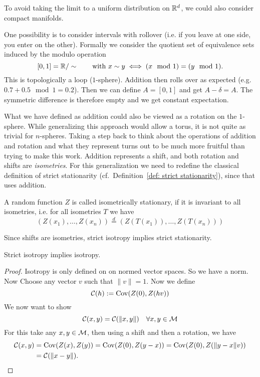 To avoid taking the limit to a uniform distribution on \(\mathbb{R}^d\), we could
also consider compact manifolds.

\begin{example}[1-sphere]
	One possibility is to consider intervals with
	rollover (i.e. if you leave at one side, you enter on the other). Formally
	we consider the quotient set of equivalence sets induced by the modulo operation
	\[
		[0,1] = \mathbb{R}/\sim \qquad \text{with } x\sim y \iff (x\mod 1) = (y\mod 1).
	\]
	This is topologically a loop (\(1\)-sphere). Addition then rolls over as expected (e.g. \(0.7
	+ 0.5 \mod 1 = 0.2\)).  Then we can define \(A=[0,1]\) and get \(A-\delta = A\).
	The symmetric difference is therefore empty and we get constant expectation.
\end{example}

What we have defined as addition could also be viewed as a rotation on the
\(1\)-sphere. While generalizing this approach would allow a torus, it is not quite
as trivial for \(n\)-spheres. Taking a step back to think about the operations
of addition and rotation and what they represent turns out to be much more
fruitful than trying to make this work. Addition represents a shift, and both
rotation and shifts are \emph{isometries}. For this generalization we need to
redefine the classical definition of strict stationarity
(cf.~Definition~\ref{def: strict stationarity}), since that uses addition.
\begin{definition}
	A random function \(Z\) is called isometrically stationary, if it is invariant to
	all isometries, i.e. for all isometries \(T\) we have
	\[
		(Z(x_1), \dots, Z(x_n))
		\overset{d}= (Z(T(x_1)), \dots, Z(T(x_n)))
	\]
\end{definition}
\begin{remark}
Since shifts are isometries, strict isotropy implies strict stationarity.
\end{remark}
\begin{lemma}
	Strict isotropy implies isotropy.
\end{lemma}
\begin{proof}
	Isotropy is only defined on on normed vector spaces. So we have a norm. Now
	Choose any vector \(v\) such that \(\|v\|=1\). Now we define
	\[
		\mathcal{C}(h):= \operatorname{Cov}(Z(0), Z(hv))
	\]
	We now want to show
	\[
		\mathcal{C}(x,y) = \mathcal{C}(\|x,y\|) \quad \forall x,y\in \mathcal{M}
	\]
	For this take any \(x,y\in \mathcal{M}\), then using
	a shift and then a rotation, we have
	\begin{align*}
		\mathcal{C}(x,y)
		&= \operatorname{Cov}(Z(x), Z(y))
		= \operatorname{Cov}(Z(0), Z(y-x))
		= \operatorname{Cov}(Z(0), Z(\|y-x\|v))\\
		&= \mathcal{C}(\|x-y\|).
		\qedhere
	\end{align*}
\end{proof}

